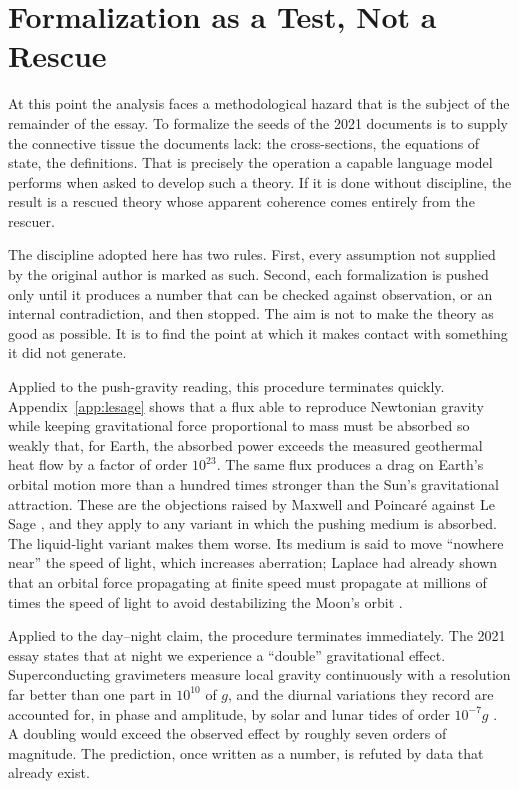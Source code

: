 \documentclass[11pt]{article}
\begin{document}
\section{Formalization as a Test, Not a Rescue}

At this point the analysis faces a methodological hazard that is the subject of the remainder of the essay. To formalize the seeds of the 2021 documents is to supply the connective tissue the documents lack: the cross-sections, the equations of state, the definitions. That is precisely the operation a capable language model performs when asked to develop such a theory. If it is done without discipline, the result is a rescued theory whose apparent coherence comes entirely from the rescuer.

The discipline adopted here has two rules. First, every assumption not supplied by the original author is marked as such. Second, each formalization is pushed only until it produces a number that can be checked against observation, or an internal contradiction, and then stopped. The aim is not to make the theory as good as possible. It is to find the point at which it makes contact with something it did not generate.

Applied to the push-gravity reading, this procedure terminates quickly. Appendix~\ref{app:lesage} shows that a flux able to reproduce Newtonian gravity while keeping gravitational force proportional to mass must be absorbed so weakly that, for Earth, the absorbed power exceeds the measured geothermal heat flow by a factor of order $10^{23}$. The same flux produces a drag on Earth's orbital motion more than a hundred times stronger than the Sun's gravitational attraction. These are the objections raised by Maxwell and Poincaré against Le Sage \cite{maxwell1875,poincare1908}, and they apply to any variant in which the pushing medium is absorbed. The liquid-light variant makes them worse. Its medium is said to move ``nowhere near'' the speed of light, which increases aberration; Laplace had already shown that an orbital force propagating at finite speed must propagate at millions of times the speed of light to avoid destabilizing the Moon's orbit \cite{laplace1805}.

Applied to the day--night claim, the procedure terminates immediately. The 2021 essay states that at night we experience a ``double'' gravitational effect. Superconducting gravimeters measure local gravity continuously with a resolution far better than one part in $10^{10}$ of $g$, and the diurnal variations they record are accounted for, in phase and amplitude, by solar and lunar tides of order $10^{-7}g$ \cite{hinderer2015}. A doubling would exceed the observed effect by roughly seven orders of magnitude. The prediction, once written as a number, is refuted by data that already exist.
\end{document}
